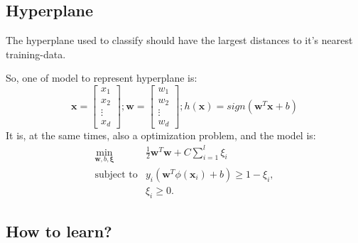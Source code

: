 \documentclass[twoside]{article}
\begin{document}
\subsection{Hyperplane}
\label{sec:svm:hyperplane}

The hyperplane used to classify should have the largest distances to it's nearest training-data.

So, one of model to represent hyperplane is:
$$
\mathbf{x} = \left[\begin{array}{c} x_1 \\ x_2 \\ \vdots \\ x_d \end{array}\right];
\mathbf{w} = \left[\begin{array}{c} w_1 \\ w_2 \\ \vdots \\ w_d \end{array}\right];
h(\mathbf{x}) = sign\left(\mathbf{w}^T\mathbf{x}+b\right)
$$
It is, at the same times, also a optimization problem, and the model\cite{svm1} is:
\begin{equation}
\label{eq:hyp:op}
\begin{array}{rl}
  \min\limits_{\mathbf{w},b,\mathbf{\xi}} & \frac{1}{2}\mathbf{w}^T\mathbf{w}+C\sum\limits_{i=1}^{l}\xi_i\\
  \text{subject to} & y_i\left(\mathbf{w}^T\phi(\mathbf{x}_i)+b\right) \geq 1 - \xi_i,\\
                                          & \xi_i \geq 0.
\end{array}
\end{equation}

\subsection{How to learn?}
\label{sec:svm:how}
\end{document}
